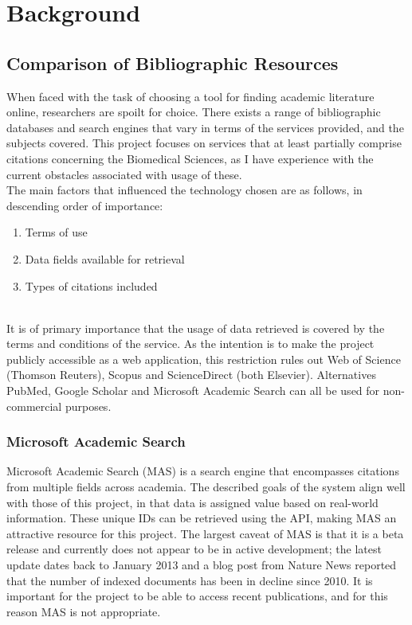\documentclass[PROP_AGutteridge_CS.tex]{subfiles}
\begin{document}
\chapter{Background}
\section{Comparison of Bibliographic Resources}
When faced with the task of choosing a tool for finding academic literature online, researchers are spoilt for choice. There exists a range of bibliographic databases and search engines that vary in terms of the services provided, and the subjects covered. This project focuses on services that at least partially comprise citations concerning the Biomedical Sciences, as I have experience with the current obstacles associated with usage of these.\\

\noindent The main factors that influenced the technology chosen are as follows, in descending order of importance:
\begin{enumerate}
\item Terms of use
\item Data fields available for retrieval
\item Types of citations included
\end{enumerate}

\noindent \\ It is of primary importance that the usage of data retrieved is covered by the terms and conditions of the service. As the intention is to make the project publicly accessible as a web application, this restriction rules out Web of Science (Thomson Reuters), Scopus and ScienceDirect (both Elsevier). Alternatives PubMed, Google Scholar and Microsoft Academic Search can all be used for non-commercial purposes.

\noindent \subsection{Microsoft Academic Search}
Microsoft Academic Search (MAS) is a search engine that encompasses citations from multiple fields across academia. The described goals of the system align well with those of this project, in that data is assigned value based on real-world information\cite{microsoft-help}. These unique IDs can be retrieved using the API, making MAS an attractive resource for this project. The largest caveat of MAS is that it is a beta release and currently does not appear to be in active development; the latest update dates back to January 2013\cite{microsoft-help} and a blog post from Nature News reported that the number of indexed documents has been in decline since 2010\cite{nature-news}. It is important for the project to be able to access recent publications, and for this reason MAS is not appropriate.
\end{document}
